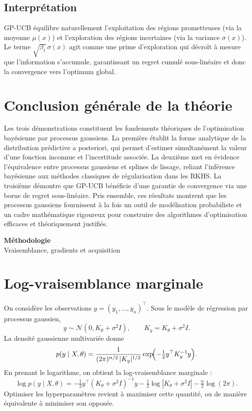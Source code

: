 \documentclass[12pt]{article}
\newcommand{\N}{\mathcal{N}}
\newcommand{\dividerpage}[2]{%
  \newpage \thispagestyle{empty}
  \vspace*{0.32\textheight}
  \begin{center}
    {\Huge\bfseries #1}\\[14pt]
    {\Large #2}
  \end{center}
  \newpage}
\begin{document}
\subsection*{Interprétation}

GP-UCB équilibre naturellement l'exploitation des régions prometteuses (via la
moyenne $\mu(x)$) et l'exploration des régions incertaines (via la variance
$\sigma(x)$). Le terme $\sqrt{\beta_t}\,\sigma(x)$ agit comme une prime
d'exploration qui décroît à mesure que l'information s'accumule, garantissant un
regret cumulé sous-linéaire et donc la convergence vers l'optimum global.

\newpage
\section*{Conclusion générale de la théorie}

Les trois démonstrations constituent les fondements théoriques de l'optimisation
bayésienne par processus gaussiens. La première établit la forme analytique de la
distribution prédictive a posteriori, qui permet d'estimer simultanément la valeur
d'une fonction inconnue et l'incertitude associée. La deuxième met en évidence
l'équivalence entre processus gaussiens et splines de lissage, reliant l'inférence
bayésienne aux méthodes classiques de régularisation dans les RKHS. La troisième
démontre que GP-UCB bénéficie d'une garantie de convergence via une borne de
regret sous-linéaire. Pris ensemble, ces résultats montrent que les processus
gaussiens fournissent à la fois un outil de modélisation probabiliste et un cadre
mathématique rigoureux pour construire des algorithmes d'optimisation efficaces et
théoriquement justifiés.

\dividerpage{Méthodologie}{Vraisemblance, gradients et acquisition}

\section*{Log-vraisemblance marginale}

On considère les observations $y = (y_1,\dots,y_n)^\top$. Sous le modèle de
régression par processus gaussien,
\[
y \sim \N(0, K_\theta + \sigma^2 I),
\qquad
K_y = K_\theta + \sigma^2 I.
\]
La densité gaussienne multivariée donne
\[
p(y \mid X, \theta) = \frac{1}{(2\pi)^{n/2}\,|K_y|^{1/2}}
\exp\!\Bigl(-\tfrac12 y^\top K_y^{-1} y\Bigr).
\]
En prenant le logarithme, on obtient la log-vraisemblance marginale :
\[
\boxed{\, \log p(y \mid X, \theta)
= -\tfrac12 y^\top (K_\theta + \sigma^2 I)^{-1} y
- \tfrac12 \log|K_\theta + \sigma^2 I|
- \tfrac{n}{2}\log(2\pi). \,}
\]
Optimiser les hyperparamètres revient à maximiser cette quantité, ou de manière
équivalente à minimiser son opposée.
\end{document}

